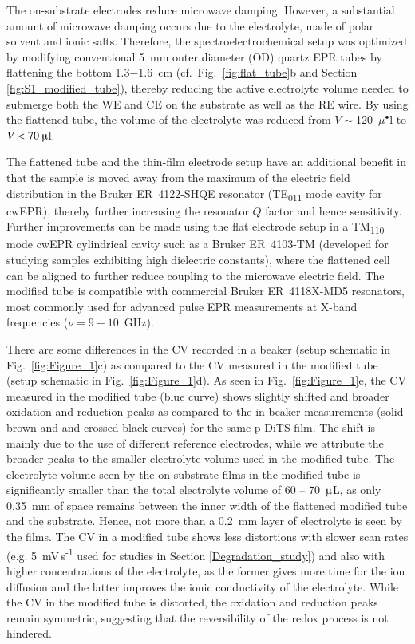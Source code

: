 The on-substrate electrodes reduce microwave damping. However, a substantial amount of microwave damping occurs due to the electrolyte, made of polar solvent and ionic salts. Therefore, the spectroelectrochemical setup was optimized by modifying conventional 5~mm outer diameter (OD) quartz EPR tubes by flattening the bottom 1.3$-$1.6~cm (cf.\ Fig.~\ref{fig:flat_tube}b and Section \ref{fig:S1_modified_tube}), thereby reducing the active electrolyte volume needed to submerge both the WE and CE on the substrate as well as the RE wire. By using the flattened tube, the volume of the electrolyte was reduced from $V\sim$120~$\mu^{\bullet}$l to $V<70~\muup$l.
\par
The flattened tube and the thin-film electrode setup have an additional benefit in that the sample is moved away from the maximum of the electric field distribution in the Bruker ER~4122-SHQE resonator (TE\textsubscript{011} mode cavity for cwEPR), thereby further increasing the resonator $Q$ factor and hence sensitivity. Further improvements can be made using the flat electrode setup in a TM\textsubscript{110} mode cwEPR cylindrical cavity such as a Bruker ER~4103-TM (developed for studying samples exhibiting high dielectric constants), where the flattened cell can be aligned to further reduce coupling to the microwave electric field. The modified tube is compatible with commercial Bruker ER~4118X-MD5 resonators, most commonly used for advanced pulse EPR measurements at X-band frequencies ($\nu = 9-10$~GHz).\\

\par
There are some differences in the CV recorded in a beaker (setup schematic in Fig.~\ref{fig:Figure_1}c) as compared to the CV measured in the modified tube (setup schematic in Fig.~\ref{fig:Figure_1}d). As seen in Fig.~\ref{fig:Figure_1}e, the CV measured in the modified tube (blue curve) shows slightly shifted and broader oxidation and reduction peaks as compared to the in-beaker measurements (solid-brown and and crossed-black curves) for the same p-DiTS film. The shift is mainly due to the use of different reference electrodes, while we attribute the broader peaks to the smaller electrolyte volume used in the modified tube. The electrolyte volume seen by the on-substrate films in the modified tube is significantly smaller than the total electrolyte volume of 60 -- 70~$\muup$L, as only 0.35~mm of space remains between the inner width of the flattened modified tube and the substrate. Hence, not more than a 0.2~mm layer of electrolyte is seen by the films. The CV in a modified tube shows less distortions with slower scan rates (e.g. 5~mV\,s\textsuperscript{-1} used for studies in Section \ref{Degradation_study}) and also with higher concentrations of the electrolyte, as the former gives more time for the ion diffusion and the latter improves the ionic conductivity of the electrolyte. While the CV in the modified tube is distorted, the oxidation and reduction peaks remain symmetric, suggesting that the reversibility of the redox process is not hindered.



